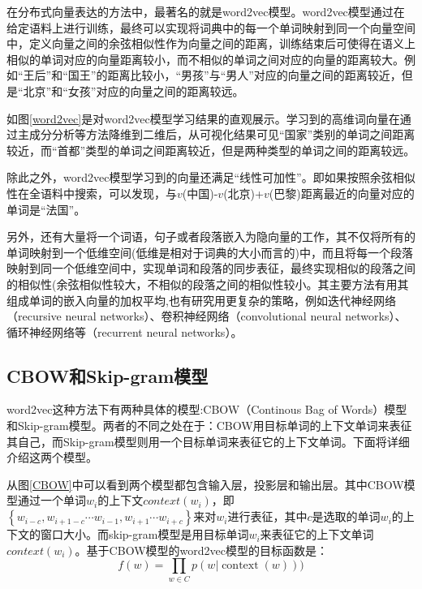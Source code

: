 在分布式向量表达的方法中，最著名的就是word2vec模型。word2vec模型通过在给定语料上进行训练，最终可以实现将词典中的每一个单词映射到同一个向量空间中，定义向量之间的余弦相似性作为向量之间的距离，训练结束后可使得在语义上相似的单词对应的向量距离较小，而不相似的单词之间对应的向量的距离较大。例如“王后”和“国王”的距离比较小，“男孩”与“男人”对应的向量之间的距离较近，但是“北京”和“女孩”对应的向量之间的距离较远。

如图\ref{word2vec}是对word2vec模型学习结果的直观展示。学习到的高维词向量在通过主成分分析等方法降维到二维后，从可视化结果可见“国家”类别的单词之间距离较近，而“首都”类型的单词之间距离较近，但是两种类型的单词之间的距离较远。

除此之外，word2vec模型学习到的向量还满足“线性可加性”。即如果按照余弦相似性在全语料中搜索，可以发现，与$v$(中国)-$v$(北京)+$v$(巴黎)距离最近的向量对应的单词是“法国”。

另外，还有大量将一个词语，句子或者段落嵌入为隐向量的工作，其不仅将所有的单词映射到一个低维空间(低维是相对于词典的大小而言的)中，而且将每一个段落映射到同一个低维空间中，实现单词和段落的同步表征，最终实现相似的段落之间的相似性(余弦相似性较大，不相似的段落之间的相似性较小。其主要方法有用其组成单词的嵌入向量的加权平均,也有研究用更复杂的策略，例如迭代神经网络（recursive neural networks）、卷积神经网络（convolutional neural networks）、循环神经网络等（recurrent neural networks）。

\subsection{CBOW和Skip-gram模型}

word2vec这种方法下有两种具体的模型:CBOW（Continous Bag of Words）模型和Skip-gram模型。两者的不同之处在于：CBOW用目标单词的上下文单词来表征其自己，而Skip-gram模型则用一个目标单词来表征它的上下文单词。下面将详细介绍这两个模型。

从图\ref{CBOW}中可以看到两个模型都包含输入层，投影层和输出层。其中CBOW模型通过一个单词$w_i$的上下文$context(w_i)$，即$\left\{ w _ { i - c } , w _ { i + 1 - c } \cdots w _ { i - 1 } , w _ { i + 1 } \cdots w _ { i + c }\right\}$来对$w_i$进行表征，其中$c$是选取的单词$w_i$的上下文的窗口大小。而skip-gram模型是用目标单词$w_i$来表征它的上下文单词$context(w_i)$。基于CBOW模型的word2vec模型的目标函数是：
\begin{equation}
f ( w ) = \prod _ { w \in C } p ( w | \operatorname { context } ( w ) ) )
\end{equation}

